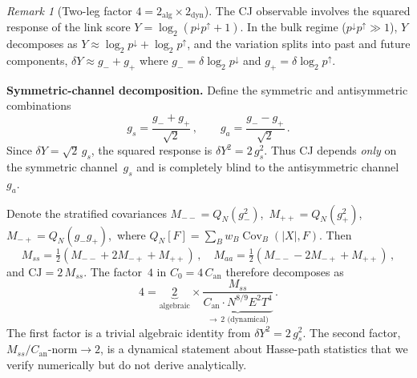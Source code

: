 \documentclass[12pt,a4paper]{article}
\theoremstyle{plain}
\theoremstyle{definition}
\theoremstyle{remark}
\newtheorem{remark}[theorem]{Remark}
\newcommand{\Cov}{\operatorname{Cov}}
\newcommand{\CJ}{\mathrm{CJ}}
\begin{document}
\begin{remark}[Two-leg factor $4 = 2_{\mathrm{alg}} \times 2_{\mathrm{dyn}}$]
\label{rem:factor4}
The CJ observable involves the squared response of the link score
$Y = \log_2(p^{\downarrow} p^{\uparrow} + 1)$.  In the bulk
regime ($p^{\downarrow} p^{\uparrow} \gg 1$), $Y$ decomposes as
$Y \approx \log_2 p^{\downarrow} + \log_2 p^{\uparrow}$, and
the variation splits into past and future components,
$\delta Y \approx g_- + g_+$ where
$g_- = \delta \log_2 p^{\downarrow}$ and
$g_+ = \delta \log_2 p^{\uparrow}$.

\medskip\noindent\textbf{Symmetric-channel decomposition.}\enspace
Define the symmetric and antisymmetric combinations
\begin{equation}\label{eq:gs-ga}
  g_s = \frac{g_- + g_+}{\sqrt{2}}\,,\qquad
  g_a = \frac{g_- - g_+}{\sqrt{2}}\,.
\end{equation}
Since $\delta Y = \sqrt{2}\,g_s$, the squared response is
$\delta Y^2 = 2\,g_s^2$.  Thus CJ depends \emph{only} on the
symmetric channel~$g_s$ and is completely blind to the
antisymmetric channel~$g_a$.

Denote the stratified covariances
$M_{--} = Q_N(g_-^2)$,\, $M_{++} = Q_N(g_+^2)$,\,
$M_{-+} = Q_N(g_- g_+)$,\, where
$Q_N[F] = \sum_B w_B \Cov_B(|X|, F)$.  Then
\begin{equation}\label{eq:Mss-def}
  M_{ss} = \tfrac{1}{2}(M_{--} + 2M_{-+} + M_{++})\,,\quad
  M_{aa} = \tfrac{1}{2}(M_{--} - 2M_{-+} + M_{++})\,,
\end{equation}
and $\CJ = 2\,M_{ss}$.  The factor~$4$ in $C_0 = 4\,C_{\mathrm{an}}$
therefore decomposes as
\begin{equation}\label{eq:factor4-decomp}
  4 = \underbrace{2}_{\text{algebraic}} \times
      \underbrace{\frac{M_{ss}}{C_{\mathrm{an}} \cdot N^{8/9} E^2 T^4}}_{\to\, 2\text{ (dynamical)}}\,.
\end{equation}
The first factor is a trivial algebraic identity from $\delta Y^2 = 2\,g_s^2$.
The second factor, $M_{ss} / C_{\mathrm{an}}\text{-norm} \to 2$, is a
dynamical statement about Hasse-path statistics that we verify numerically
but do not derive analytically.


\end{remark}
\end{document}
